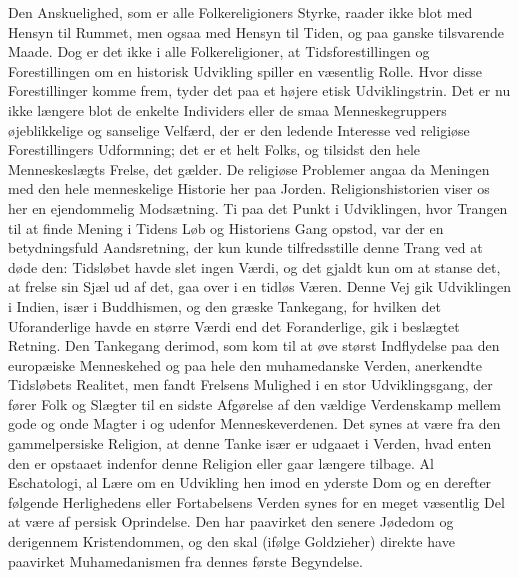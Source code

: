 \documentclass[12pt,a4paper]{article}
\newcommand{\opage}[1]{\marginnote{\footnotesize\textit{[#1]}}}
\begin{document}
Den Anskuelighed, som er alle Folkereligioners Styrke, raader ikke blot med
Hensyn til Rummet, men ogsaa med Hensyn til Tiden, og paa ganske
tilsvarende Maade. Dog er det ikke i alle Folkereligioner, at
Tidsforestillingen og Forestillingen om en historisk Udvikling spiller en
væsentlig Rolle. Hvor disse Forestillinger komme frem, tyder det paa et
højere etisk Udviklingstrin. Det er nu ikke længere blot de enkelte
Individers eller de smaa Menneskegruppers øjeblikkelige og sanselige
Velfærd, der er den ledende Interesse ved religiøse Forestillingers
Udformning; det er et helt Folks, og tilsidst den hele Menneskeslægts
Frelse, det gælder. De religiøse Problemer angaa da Meningen med den hele
menneskelige Historie her paa Jorden. Religionshistorien viser os her en
ejendommelig Modsætning. Ti paa det Punkt i Udviklingen, hvor Trangen til at
finde Mening i Tidens Løb og Historiens Gang opstod, var der en
betydningsfuld Aandsretning, der kun kunde tilfredsstille denne Trang ved at
døde den: Tidsløbet havde slet ingen Værdi, og det gjaldt kun om at stanse
det, at frelse sin Sjæl ud af det, gaa over i en tidløs Væren. Denne Vej gik
Udviklingen i Indien, især i Buddhismen, og den græske Tankegang, for
hvilken det Uforanderlige havde en større Værdi end det Foranderlige, gik i
beslægtet Retning. Den Tankegang derimod, som kom til at øve størst
Indflydelse paa den europæiske Menneskehed og paa hele den muhamedanske
Verden, anerkendte Tidsløbets Realitet, men fandt Frelsens Mulighed i en
stor Udviklingsgang, der fører Folk og Slægter til en sidste Afgørelse af
den vældige Verdenskamp mellem gode og onde Magter i og udenfor
Menneskeverdenen. \opage{14} Det synes at være fra den gammelpersiske Religion, at
denne Tanke især er udgaaet i Verden, hvad enten den er opstaaet indenfor
denne Religion eller gaar længere tilbage. Al Eschatologi, al Lære om en
Udvikling hen imod en yderste Dom og en derefter følgende Herlighedens eller
Fortabelsens Verden synes for en meget væsentlig Del at være af persisk
Oprindelse. Den har paavirket den senere Jødedom og derigennem
Kristendommen, og den skal (ifølge Goldzieher) direkte have paavirket
Muhamedanismen fra dennes første Begyndelse.
\end{document}
